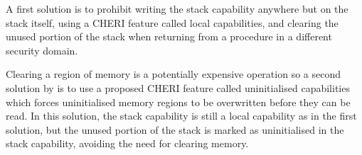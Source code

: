 \documentclass[main.tex]{subfiles}
\begin{document}
A first solution is to prohibit writing the stack capability anywhere but on the stack itself, using a CHERI feature called local capabilities, and clearing the unused portion of the stack when returning from a procedure in a different security domain.

Clearing a region of memory is a potentially expensive operation so a second solution by \cite{uninitcaps} is to use a proposed CHERI feature called uninitialised capabilities which forces uninitialised memory regions to be overwritten before they can be read. In this solution, the stack capability is still a local capability as in the first solution, but the unused portion of the stack is marked as uninitialised in the stack capability, avoiding the need for clearing memory.
\end{document}
